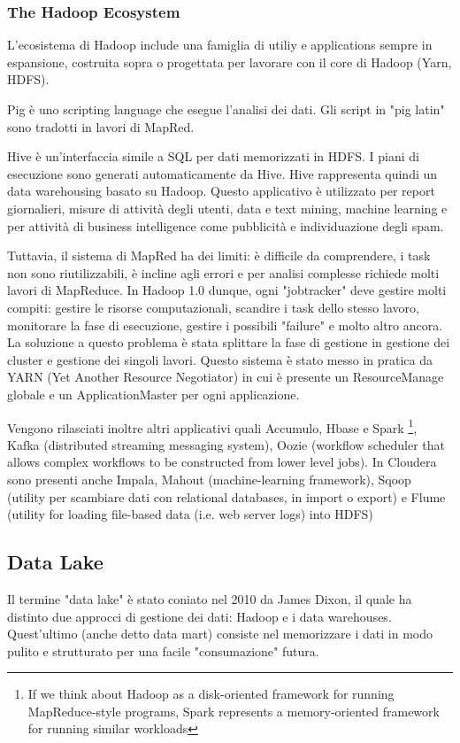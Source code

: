 \documentclass[a4page, 11pt]{article}
\begin{document}
\subsubsection{The Hadoop Ecosystem}
L'ecosistema di Hadoop include una famiglia di utiliy e applications sempre in espansione, costruita sopra o progettata per lavorare con il core di Hadoop (Yarn, HDFS).

Pig è uno scripting language che esegue l’analisi dei dati. Gli script in "pig latin" sono tradotti in lavori di MapRed. 

Hive è un’interfaccia simile a SQL per dati memorizzati in HDFS. I piani di esecuzione sono generati automaticamente da Hive. Hive rappresenta quindi un data warehousing basato su Hadoop. Questo applicativo è utilizzato per report giornalieri, misure di attività degli utenti, data e text mining, machine learning e per attività di business intelligence come pubblicità e individuazione degli spam.

Tuttavia, il sistema di MapRed ha dei limiti: è difficile da comprendere, i task non sono riutilizzabili, è incline agli errori e per analisi complesse richiede molti lavori di MapReduce. In Hadoop 1.0 dunque, ogni "jobtracker" deve gestire molti compiti: gestire le risorse computazionali, scandire i task dello stesso lavoro, monitorare la fase di esecuzione, gestire i possibili "failure" e molto altro ancora. La soluzione a questo problema è stata splittare la fase di gestione in gestione dei cluster e gestione dei singoli lavori. Questo sistema è stato messo in pratica da YARN (Yet Another Resource Negotiator) in cui è presente un ResourceManage globale e un ApplicationMaster per ogni applicazione.

Vengono rilasciati inoltre altri applicativi quali Accumulo, Hbase e Spark \footnote{If we think about Hadoop as a disk-oriented framework for running MapReduce-style programs, Spark represents a memory-oriented framework for running similar workloads}, Kafka (distributed streaming messaging system), Oozie (workflow scheduler that allows complex workflows to be constructed from lower level jobs).
In Cloudera sono presenti anche Impala, Mahout (machine-learning framework), Sqoop (utility per scambiare dati con relational databases, in import o export) e Flume (utility for loading file-based data (i.e. web server logs) into HDFS) 

\subsection{Data Lake}
Il termine "data lake" è stato coniato nel 2010 da James Dixon, il quale ha distinto due approcci di gestione dei dati: Hadoop e i data warehouses. Quest’ultimo (anche detto data mart) consiste nel memorizzare i dati in modo pulito e strutturato per una facile "consumazione" futura.
\end{document}
